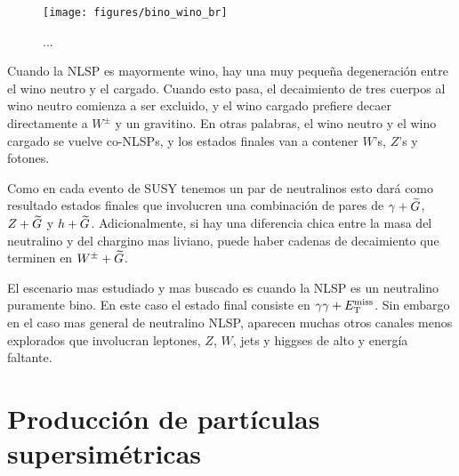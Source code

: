 \begin{figure}[h]
  \centering \texttt{[image: figures/bino\_wino\_br]}
  \caption{...}
  \label{fig:bino_wino_br}
\end{figure}

Cuando la NLSP es mayormente wino, hay una muy pequeña degeneración entre el
wino neutro y el cargado. Cuando esto pasa, el decaimiento de tres cuerpos al
wino neutro comienza a ser excluido, y el wino cargado prefiere decaer
directamente a $W^{\pm}$ y un gravitino. En otras palabras, el wino neutro y el
wino cargado se vuelve co-NLSPs, y los estados finales van a contener $W$'s,
$Z$'s y fotones.

Como en cada evento de SUSY tenemos un par de neutralinos esto dará como
resultado estados finales que involucren una combinación de pares de $\gamma + \widetilde{G}$, $Z +
\widetilde{G}$ y $h + \widetilde{G}$. Adicionalmente, si hay una diferencia chica entre la masa
del neutralino y del chargino mas liviano, puede haber cadenas de decaimiento
que terminen en $W^\pm + \widetilde{G}$.

El escenario mas estudiado y mas buscado es cuando la NLSP es un neutralino
puramente bino. En este caso el estado final consiste en $\gamma\gamma + E_{\mathrm{T}}^{\mathrm{miss}}$.
Sin embargo en el caso mas general de neutralino NLSP, aparecen muchas otros
canales menos explorados que involucran leptones, $Z$, $W$, jets y higgses de
alto {\pt} y energía faltante.








\section{Producción de partículas supersimétricas}

